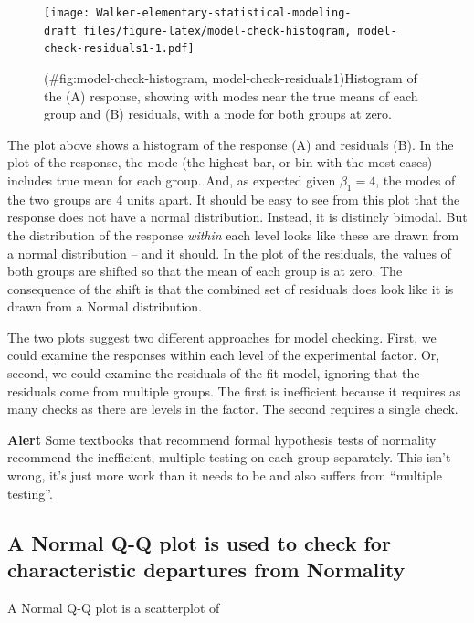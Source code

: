 \documentclass[]{book}
\begin{document}
\begin{figure}
\centering
\texttt{[image: Walker-elementary-statistical-modeling-draft\_files/figure-latex/model-check-histogram, model-check-residuals1-1.pdf]}
\caption{(\#fig:model-check-histogram, model-check-residuals1)Histogram of the (A) response, showing with modes near the true means of each group and (B) residuals, with a mode for both groups at zero.}
\end{figure}

The plot above shows a histogram of the response (A) and residuals (B). In the plot of the response, the mode (the highest bar, or bin with the most cases) includes true mean for each group. And, as expected given \(\beta_1=4\), the modes of the two groups are 4 units apart. It should be easy to see from this plot that the response does not have a normal distribution. Instead, it is distincly bimodal. But the distribution of the response \emph{within} each level looks like these are drawn from a normal distribution -- and it should. In the plot of the residuals, the values of both groups are shifted so that the mean of each group is at zero. The consequence of the shift is that the combined set of residuals does look like it is drawn from a Normal distribution.

The two plots suggest two different approaches for model checking. First, we could examine the responses within each level of the experimental factor. Or, second, we could examine the residuals of the fit model, ignoring that the residuals come from multiple groups. The first is inefficient because it requires as many checks as there are levels in the factor. The second requires a single check.

\textbf{Alert} Some textbooks that recommend formal hypothesis tests of normality recommend the inefficient, multiple testing on each group separately. This isn't wrong, it's just more work than it needs to be and also suffers from ``multiple testing''.

\hypertarget{a-normal-q-q-plot-is-used-to-check-for-characteristic-departures-from-normality}{%
\subsection{A Normal Q-Q plot is used to check for characteristic departures from Normality}\label{a-normal-q-q-plot-is-used-to-check-for-characteristic-departures-from-normality}}

A Normal Q-Q plot is a scatterplot of
\end{document}
